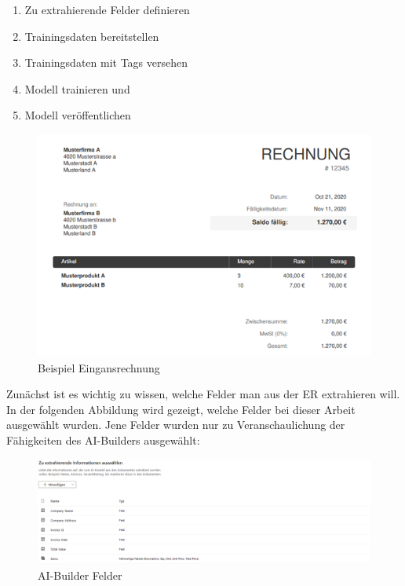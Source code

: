 \begin{enumerate}
    \item Zu extrahierende Felder definieren
    \item Trainingsdaten bereitstellen
    \item Trainingsdaten mit Tags versehen
    \item Modell trainieren und
    \item Modell veröffentlichen
\end{enumerate}

\begin{figure}[h]
    \centering
    \includegraphics[scale=0.9]{sections/cloud-computing/images/example-invoice.png}
    \caption{Beispiel Eingansrechnung}
    \label{fig:example-invoice-figure}
\end{figure}

Zunächst ist es wichtig zu wissen, welche Felder man aus der ER extrahieren will. In der folgenden Abbildung wird gezeigt, welche Felder bei dieser Arbeit ausgewählt wurden. Jene Felder wurden nur zu Veranschaulichung der Fähigkeiten des AI-Builders ausgewählt:

\begin{figure}[h]
    \centering
    \includegraphics[scale=0.5]{sections/cloud-computing/images/ai-builder-fields.png}
    \caption{AI-Builder Felder}
    \label{fig:ai-builder-fields-figure}
\end{figure}

